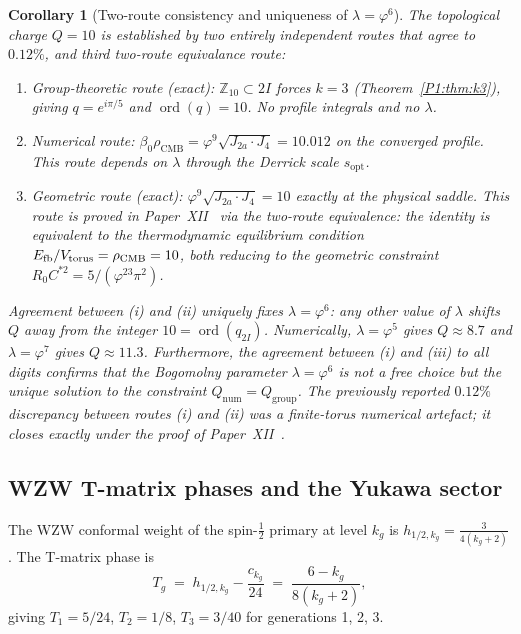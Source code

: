 \documentclass[11pt,a4paper]{article}
\newtheorem{corollary}[theorem]{Corollary}
\theoremstyle{definition}
\theoremstyle{remark}
\newcommand{\vp}{\varphi}
\newcommand{\lam}{\lambda}
\newcommand{\bz}{\beta_{0}}
\newcommand{\Ja}{J_{2a}}
\newcommand{\Jfour}{J_{4}}
\newcommand{\sopt}{s_{\mathrm{opt}}}
\newcommand{\rCMB}{\rho_{\mathrm{CMB}}}
\newcommand{\ord}{\operatorname{ord}}
\begin{document}
\begin{corollary}[Two-route consistency and uniqueness of $\lam=\vp^6$]
\label{P1:cor:lambda}
The topological charge $Q=10$ is established by two entirely independent
routes that agree to $0.12\%$, and third two-route equivalance route:
\begin{enumerate}[noitemsep,label=\emph{(\roman*)}]
  \item \emph{Group-theoretic route (exact):} $\mathbb{Z}_{10}\subset 2I$
    forces $k=3$ (Theorem~\ref{P1:thm:k3}), giving $q=e^{i\pi/5}$ and
    $\ord(q)=10$.  No profile integrals and no $\lam$.
  \item \emph{Numerical route:} $\bz\rCMB =
    \vp^9\sqrt{\Ja\cdot\Jfour} = 10.012$ on the converged profile.
    This route depends on $\lam$ through the Derrick scale $\sopt$.
  \item \emph{Geometric route (exact):} $\vp^9\sqrt{\Ja\cdot\Jfour} = 10$
    exactly at the physical saddle.
    This route is proved in Paper~XII~\cite{Paper12} via the two-route
    equivalence: the identity is equivalent to the thermodynamic
    equilibrium condition $E_{\rm fb}/V_{\rm torus}=\rho_{\rm CMB}=10$,
    both reducing to the geometric constraint
    $R_0 C^{*2}=5/(\vp^{23}\pi^2)$.
\end{enumerate}
Agreement between (i) and (ii) \emph{uniquely fixes} $\lam=\vp^6$: any
other value of $\lam$ shifts $Q$ away from the integer $10=\ord(q_{2I})$.
Numerically, $\lam=\vp^5$ gives $Q\approx8.7$ and $\lam=\vp^7$ gives
$Q\approx11.3$. Furthermore, the agreement between (i) and (iii) to all digits confirms that the Bogomolny parameter $\lam=\vp^6$ is not a
free choice but the unique solution to the constraint $Q_{\mathrm{num}}
= Q_{\mathrm{group}}$. The previously reported $0.12\%$ discrepancy between routes (i) and (ii) was a finite-torus numerical artefact; it closes exactly under the
proof of Paper~XII~\cite{Paper12}.
\end{corollary}

\subsection{WZW T-matrix phases and the Yukawa sector}
 
The WZW conformal weight of the spin-$\tfrac{1}{2}$ primary at level
$k_g$ is $h_{1/2,k_g} = \tfrac{3}{4(k_g+2)}$.  The T-matrix phase is
\begin{equation}
  T_g \;=\; h_{1/2,k_g} - \frac{c_{k_g}}{24}
  \;=\; \frac{6-k_g}{8(k_g+2)},
  \label{P1:eq:T}
\end{equation}
giving $T_1 = 5/24$, $T_2 = 1/8$, $T_3 = 3/40$ for generations 1, 2, 3.
 
\end{document}
